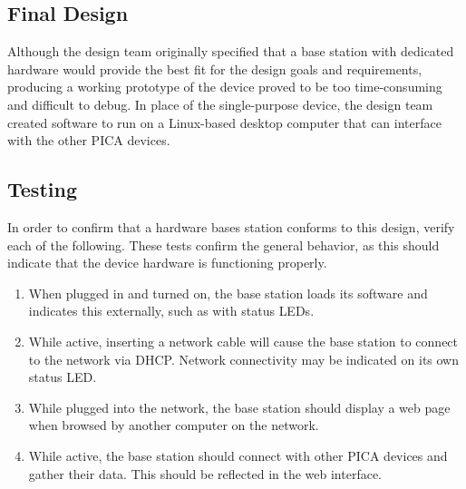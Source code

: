\subsection{Final Design}
Although the design team originally specified that a base station with
dedicated hardware would provide the best fit for the design goals and
requirements, producing a working prototype of the device proved to be too
time-consuming and difficult to debug. In place of the single-purpose
device, the design team created software to run on a Linux-based desktop
computer that can interface with the other \ac{PICA} devices.

\subsection{Testing}
In order to confirm that a hardware bases station conforms to this
design, verify each of the following. These tests confirm the general behavior,
as this should indicate that the device hardware is functioning
properly. 
\begin{enumerate}
  \item When plugged in and turned on, the base station loads its
    software and indicates this externally, such as with status
    \acp{LED}.
  \item While active, inserting a network cable will cause the base
    station to connect to the network via \ac{DHCP}. Network connectivity
    may be indicated on its own status \ac{LED}.
  \item While plugged into the network, the base station should
    display a web page when browsed by another computer on the
    network.
  \item While active, the base station should connect with other \ac{PICA}
    devices and gather their data. This should be reflected in the web
    interface.
\end{enumerate}

